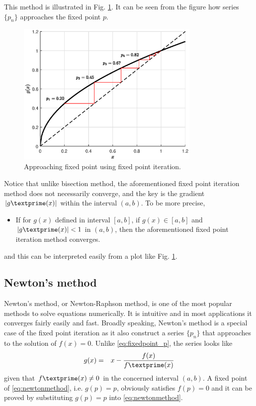 This method is illustrated in Fig. \ref{fig:part-5:fixed_point_iteration}. It can be seen from the figure how series $\{p_n\}$ approaches the fixed point $p$.

\begin{figure}[!htbp]
\centering
\includegraphics[width=250pt]{chapters/part-5/figures/demo_fixed_point_iteration.eps}
\caption{Approaching fixed point using fixed point iteration.} \label{fig:part-5:fixed_point_iteration}
\end{figure}

Notice that unlike bisection method, the aforementioned fixed point iteration method does not necessarily converge, and the key is the gradient $|g\textprime(x)|$ within the interval $(a, b)$. To be more precise,
\begin{itemize}
  \item If for $g(x)$ defined in interval $[a, b]$, if $g(x)\in[a, b]$ and $|g\textprime(x)|<1$ in $(a, b)$, then the aforementioned fixed point iteration method converges.
\end{itemize}
and this can be interpreted easily from a plot like Fig. \ref{fig:part-5:fixed_point_iteration}.

\subsection{Newton's method}

Newton's method, or Newton-Raphson method, is one of the most popular methods to solve equations numerically. It is intuitive and in most applications it converges fairly easily and fast. Broadly speaking, Newton's method is a special case of the fixed point iteration as it also construct a series $\{p_n\}$ that approaches to the solution of $f(x)=0$. Unlike \eqref{eq:fixedpoint_p}, the series looks like
\begin{eqnarray}
  g(x) &=& x - \frac{f(x)}{f\textprime(x)} \label{eq:newtonmethod}
\end{eqnarray}
given that $f\textprime(x)\neq 0$ in the concerned interval $(a,b)$. A fixed point of \eqref{eq:newtonmethod}, i.e. $g(p)=p$, obviously satisfies $f(p)=0$ and it can be proved by substituting $g(p)=p$ into \eqref{eq:newtonmethod}.

